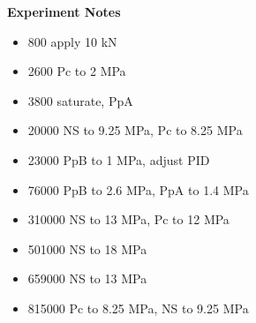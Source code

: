 \documentclass[letterpaper, 10pt]{article}
\begin{document}
\newpage 
 \textbf{Experiment Notes}
 \medskip
 {\small \begin{itemize}[label=\#]
 \setlength\itemsep{0.25em}
 	 \item 800 apply 10 kN
 	 \item 2600 Pc to 2 MPa
 	 \item 3800 saturate, PpA
 	 \item 20000 NS to 9.25 MPa, Pc to 8.25 MPa
 	 \item 23000 PpB to 1 MPa, adjust PID
 	 \item 76000 PpB to 2.6 MPa, PpA to 1.4 MPa
 	 \item 310000 NS to 13 MPa, Pc to 	12 MPa
 	 \item 501000 NS to 18 MPa
 	 \item 659000 NS to 13 MPa
 	 \item 815000 Pc to 8.25 MPa, NS to 9.25 MPa
 \end{itemize}} 

 
\end{document}

